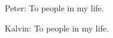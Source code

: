 \newpage
\thispagestyle{empty}

\begin{center}
Peter: To people in my life.

\vspace{0.3in}

Kalvin: To people in my life.
\end{center}

\setlength{\abovedisplayskip}{-5pt}
\setlength{\abovedisplayshortskip}{-5pt}
